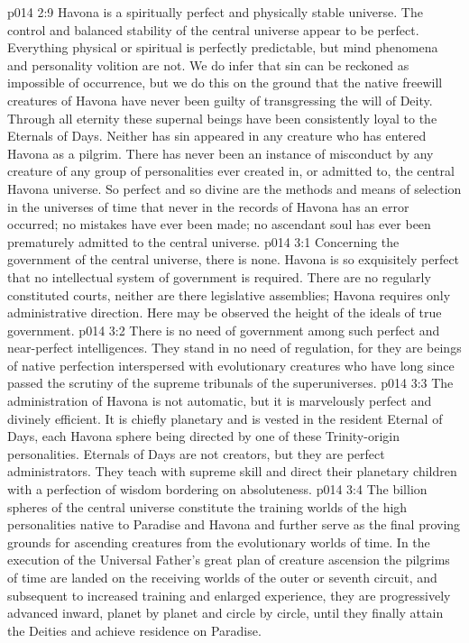 \vs p014 2:9 \pc Havona is a spiritually perfect and physically stable universe. The control and balanced stability of the central universe appear to be perfect. Everything physical or spiritual is perfectly predictable, but mind phenomena and personality volition are not. We do infer that sin can be reckoned as impossible of occurrence, but we do this on the ground that the native freewill creatures of Havona have never been guilty of transgressing the will of Deity. Through all eternity these supernal beings have been consistently loyal to the Eternals of Days. Neither has sin appeared in any creature who has entered Havona as a pilgrim. There has never been an instance of misconduct by any creature of any group of personalities ever created in, or admitted to, the central Havona universe. So perfect and so divine are the methods and means of selection in the universes of time that never in the records of Havona has an error occurred; no mistakes have ever been made; no ascendant soul has ever been prematurely admitted to the central universe.
\vs p014 3:1 Concerning the government of the central universe, there is none. Havona is so exquisitely perfect that no intellectual system of government is required. There are no regularly constituted courts, neither are there legislative assemblies; Havona requires only administrative direction. Here may be observed the height of the ideals of true government.
\vs p014 3:2 There is no need of government among such perfect and near\hyp{}perfect intelligences. They stand in no need of regulation, for they are beings of native perfection interspersed with evolutionary creatures who have long since passed the scrutiny of the supreme tribunals of the superuniverses.
\vs p014 3:3 The administration of Havona is not automatic, but it is marvelously perfect and divinely efficient. It is chiefly planetary and is vested in the resident Eternal of Days, each Havona sphere being directed by one of these Trinity\hyp{}origin personalities. Eternals of Days are not creators, but they are perfect administrators. They teach with supreme skill and direct their planetary children with a perfection of wisdom bordering on absoluteness.
\vs p014 3:4 The billion spheres of the central universe constitute the training worlds of the high personalities native to Paradise and Havona and further serve as the final proving grounds for ascending creatures from the evolutionary worlds of time. In the execution of the Universal Father’s great plan of creature ascension the pilgrims of time are landed on the receiving worlds of the outer or seventh circuit, and subsequent to increased training and enlarged experience, they are progressively advanced inward, planet by planet and circle by circle, until they finally attain the Deities and achieve residence on Paradise.

